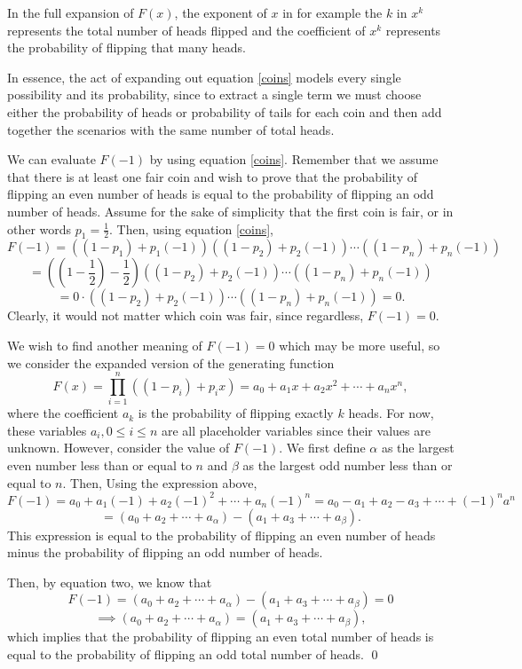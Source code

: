 \documentclass[12pt]{article}
\begin{document}
In the full expansion of $F(x)$, the exponent of $x$ in for example the $k$ in $x^k$ represents the total number of heads flipped and the coefficient of $x^k$ represents the probability of flipping that many heads.

In essence, the act of expanding out equation \ref{coins} models every single possibility and its probability, since to extract a single term we must choose either the probability of heads or probability of tails for each coin and then add together the scenarios with the same number of total heads.

We can evaluate $F(-1)$ by using equation \ref{coins}. Remember that we assume that there is at least one fair coin and wish to prove that the probability of flipping an even number of heads is equal to the probability of flipping an odd number of heads. Assume for the sake of simplicity that the first coin is fair, or in other words $p_1=\frac{1}{2}$. Then, using equation \ref{coins},
\[F(-1)=((1-p_1) + p_1 (-1))((1-p_2)+p_2(-1))\cdots ((1-p_n) + p_n (-1)) \]\[= \left(\left(1-\frac{1}{2}\right)-\frac{1}{2}\right)((1-p_2)+p_2(-1))\cdots ((1-p_n) + p_n (-1))\]
\[= 0 \cdot ((1-p_2)+p_2(-1))\cdots ((1-p_n) + p_n (-1)) = 0.\] Clearly, it would not matter which coin was fair, since regardless, $F(-1)=0$.

We wish to find another meaning of $F(-1)=0$ which may be more useful, so we consider the expanded version of the generating function \[F(x)=\prod_{i=1}^n ((1-p_i) + p_i x)=a_0 + a_1 x + a_2 x^2 + \cdots + a_n x^n,\] where the coefficient $a_k$ is the probability of flipping exactly $k$ heads. For now, these variables $a_i, 0 \le i \le n$ are all placeholder variables since their values are unknown. However, consider the value of $F(-1)$. We first define $\alpha$ as the largest even number less than or equal to $n$ and $\beta$ as the largest odd number less than or equal to $n$. Then, Using the expression above, \[F(-1)=a_0 + a_1 (-1) + a_2 (-1)^2 + \cdots + a_n (-1)^n=a_0 - a_1 + a_2 - a_3 + \cdots + (-1)^n a^n\]
\begin{equation} \label{F(-1)}= (a_0 + a_2 + \cdots + a_{\alpha})-(a_1 + a_3 + \cdots + a_{\beta}).\end{equation} This expression is equal to the probability of flipping an even number of heads minus the probability of flipping an odd number of heads.

Then, by equation two, we know that \[F(-1)=(a_0 + a_2 + \cdots + a_{\alpha})-(a_1 + a_3 + \cdots + a_{\beta}) = 0\]\[\implies (a_0 + a_2 + \cdots + a_{\alpha})=(a_1 + a_3 + \cdots + a_{\beta}), \] which implies that the probability of flipping an even total number of heads is equal to the probability of flipping an odd total number of heads. \qed
\end{document}
